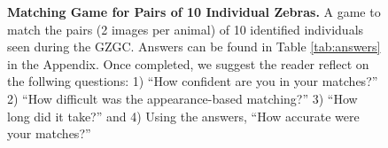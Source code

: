 \begin{figure}[!htb]
    \vspace{0.1cm}
    \vspace{0.1cm}
    \caption[Matching Game for Pairs of 10 Individual Zebras]{\textbf{Matching Game for Pairs of 10 Individual Zebras.}  A game to match the pairs (2 images per animal) of 10 identified individuals seen during the GZGC.    Answers can be found in Table \ref{tab:answers} in the Appendix.  Once completed, we suggest the reader reflect on the follwing questions: 1) ``How confident are you in your matches?'' 2) ``How difficult was the appearance-based matching?'' 3) ``How long did it take?'' and 4) Using the answers, ``How accurate were your matches?''}
        \label{fig:matching}
\end{figure}


